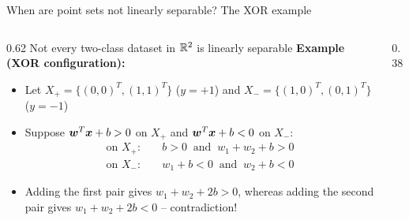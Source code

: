 \documentclass[aspectratio=169]{beamer}\usepackage[]{graphicx}\usepackage[]{xcolor}
\begin{document}
\begin{frame}[red]{When are point sets not linearly separable? The XOR example}
    \begin{columns}[c]
    \begin{column}{0.62\textwidth}
        Not every two-class dataset in $\mathbb{R}^2$ is linearly separable
        \vskip0.1cm
        \textbf{Example (XOR configuration):}
        \begin{itemize}
            \item Let $X_+ = \{(0, 0)^T, (1, 1)^T\}$ ($y = +1$) and $X_- = \{(1, 0)^T, (0, 1)^T\}$ ($y = -1$)
            \item Suppose $\bm{w}^T \bm{x} + b > 0$ on $X_+$ and $\bm{w}^T \bm{x} + b < 0$ on $X_-$:
            \begin{align*}
                \text{on } X_+: &\quad b > 0 \;\;\text{and}\;\; w_1 + w_2 + b > 0 \\
                \text{on } X_-: &\quad w_1 + b < 0 \;\;\text{and}\;\; w_2 + b < 0
            \end{align*}
            \item Adding the first pair gives $w_1 + w_2 + 2b > 0$, whereas adding the second pair gives $w_1 + w_2 + 2b < 0$ -- contradiction!
        \end{itemize}
    \end{column}
    \begin{column}{0.38\textwidth}
        \centering
    \end{column}
    \end{columns}
\end{frame}
\end{document}
